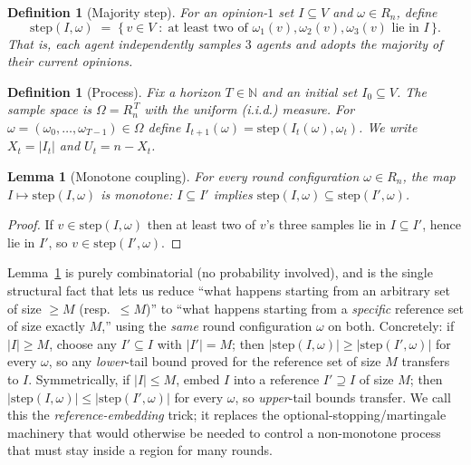 \documentclass[11pt]{article}
\newtheorem{lemma}[theorem]{Lemma}
\newtheorem{definition}[theorem]{Definition}
\newcommand{\N}{\mathbb{N}}
\begin{document}
\begin{definition}[Majority step]\label{def:step}
For an opinion-$1$ set $I \subseteq V$ and $\omega \in R_n$, define
\[
  \mathrm{step}(I, \omega) \;=\; \bigl\{\, v \in V \;:\; \text{at least two of }
  \omega_1(v), \omega_2(v), \omega_3(v) \text{ lie in } I \,\bigr\}.
\]
That is, each agent independently samples $3$ agents and adopts the majority
of their current opinions.
\end{definition}

\begin{definition}[Process]\label{def:process}
Fix a horizon $T \in \N$ and an initial set $I_0 \subseteq V$. The sample
space is $\Omega = R_n^{\,T}$ with the uniform (i.i.d.) measure. For
$\omega = (\omega_0, \dots, \omega_{T-1}) \in \Omega$ define $I_{t+1}(\omega)
= \mathrm{step}(I_t(\omega), \omega_t)$. We write $X_t = |I_t|$ and $U_t = n
- X_t$.
\end{definition}

\begin{lemma}[Monotone coupling]\label{lem:mono}
For every round configuration $\omega \in R_n$, the map $I \mapsto
\mathrm{step}(I,\omega)$ is monotone: $I \subseteq I'$ implies
$\mathrm{step}(I,\omega) \subseteq \mathrm{step}(I',\omega)$.
\end{lemma}
\begin{proof}
If $v \in \mathrm{step}(I,\omega)$ then at least two of $v$'s three samples
lie in $I \subseteq I'$, hence lie in $I'$, so $v \in \mathrm{step}(I',
\omega)$.
\end{proof}

Lemma~\ref{lem:mono} is purely combinatorial (no probability involved), and
is the single structural fact that lets us reduce ``what happens starting
from an arbitrary set of size $\ge M$ (resp.\ $\le M$)'' to ``what happens
starting from a \emph{specific} reference set of size exactly $M$,'' using
the \emph{same} round configuration $\omega$ on both. Concretely: if $|I|
\ge M$, choose any $I' \subseteq I$ with $|I'| = M$; then $|\mathrm{step}(I,
\omega)| \ge |\mathrm{step}(I',\omega)|$ for every $\omega$, so any
\emph{lower}-tail bound proved for the reference set of size $M$ transfers
to $I$. Symmetrically, if $|I| \le M$, embed $I$ into a reference $I'
\supseteq I$ of size $M$; then $|\mathrm{step}(I,\omega)| \le
|\mathrm{step}(I',\omega)|$ for every $\omega$, so \emph{upper}-tail bounds
transfer. We call this the \emph{reference-embedding} trick; it replaces the
optional-stopping/martingale machinery that would otherwise be needed to
control a non-monotone process that must stay inside a region for many
rounds.
\end{document}
